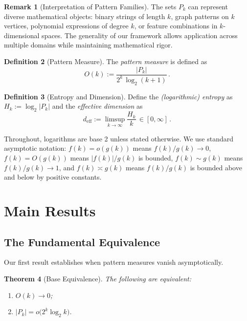 \documentclass[11pt]{article}
\newtheorem{theorem}{Theorem}
\theoremstyle{definition}
\newtheorem{definition}[theorem]{Definition}
\newtheorem{remark}[theorem]{Remark}
\begin{document}
\begin{remark}[Interpretation of Pattern Families]\label{rem:interpretation}
The sets $P_k$ can represent diverse mathematical objects: binary strings of length $k$, graph patterns on $k$ vertices, polynomial expressions of degree $k$, or feature combinations in $k$-dimensional spaces. The generality of our framework allows application across multiple domains while maintaining mathematical rigor.
\end{remark} 

\begin{definition}[Pattern Measure]
The \emph{pattern measure} is defined as
\begin{equation}
O(k):= \frac{|P_k|}{2^k\,\log_2(k+1)}\,.
\end{equation}
\end{definition}

\begin{definition}[Entropy and Dimension]
Define the \emph{(logarithmic) entropy} as $H_k:=\log_2|P_k|$ and the \emph{effective dimension} as
\begin{equation}
d_{\mathrm{eff}}:=\limsup_{k\to\infty} \frac{H_k}{k}\,\in[0,\infty]\,.
\end{equation}
\end{definition}

Throughout, logarithms are base 2 unless stated otherwise. We use standard asymptotic notation: $f(k)=o(g(k))$ means $f(k)/g(k)\to 0$, $f(k)=O(g(k))$ means $|f(k)|/g(k)$ is bounded, $f(k)\sim g(k)$ means $f(k)/g(k) \to 1$, and $f(k)\asymp g(k)$ means $f(k)/g(k)$ is bounded above and below by positive constants.

\section{Main Results}

\subsection{The Fundamental Equivalence}

Our first result establishes when pattern measures vanish asymptotically.

\begin{theorem}[Base Equivalence]\label{thm:base-equivalence}
The following are equivalent:
\begin{enumerate}
\item[(i)] $O(k)\to 0$;
\item[(ii)] $|P_k|=o\big(2^k\log_2 k\big)$.
\end{enumerate}
\end{theorem}
\end{document}
